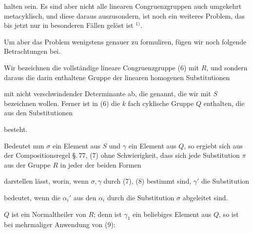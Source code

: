 halten sein. Es sind aber nicht alle linearen Congruenzgruppen auch umgekehrt metacyklisch, und diese daraus auszusondern, ist noch ein weiteres Problem, das bis jetzt nur in besonderen Fällen gelöst ist $^{1)}$.

Um aber das Problem wenigstens genauer zu formuliren, fügen wir noch folgende Betrachtungen bei.

Wir bezeichnen die vollständige lineare Congruenzgruppe (6) mit $R$, und sondern daraus die darin enthaltene Gruppe der linearen homogenen Substitutionen


mit nicht verschwindender Determinante ab, die  genannt, die wir mit $S$ bezeichnen wollen. Ferner ist in (6) die $k$ fach cyklische Gruppe $Q$ enthalten, die aus den Substitutionen


besteht.

Bedeutet nun $\sigma$ ein Element aus $S$ und $\gamma$ ein Element aus $Q$, so ergiebt sich aus der Compositionsregel §.\,77, (7) ohne Schwierigkeit, dass sich jede Substitution $\pi$ aus der Gruppe $R$  in jeder der beiden Formen


darstellen lässt, worin, wenn $\sigma, \gamma$ durch (7), (8) bestimmt sind, $\gamma'$ die Substitution


bedeutet, wenn die $\alpha_i'$ aus den $\alpha_i$ durch die Substitution $\sigma$ abgeleitet sind.

$Q$ ist ein Normaltheiler von $R$; denn ist $\gamma_1$ ein beliebiges Element aus $Q$, so ist bei mehrmaliger Anwendung von (9):

